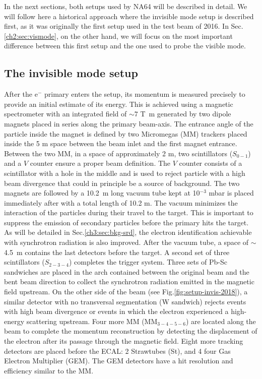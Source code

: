 In the next sections, both setups used by NA64 will be described in detail. We will follow here a historical approach where the invisible mode setup is described first, as it was originally the first setup used in the test beam of 2016. In Sec.\ref{ch2:sec:vismode}, on the other hand, we will focus on the most important difference between this first setup and the one used to probe the visible mode.


\subsection{The invisible mode setup}
\label{ch2:sec:invismode}

After the e$^-$ primary enters the setup, its momentum is measured precisely to provide an initial estimate of its energy. This is achieved using a magnetic spectrometer with an integrated field of $\sim 7$ \si{\tesla\meter} generated by two dipole magnets \cite{mbpl} placed in series along the primary beam-axis. The entrance angle of the particle inside the magnet is defined by two Micromegas (MM) trackers placed inside the 5 m space between the beam inlet and the first magnet entrance. Between the two MM, in a space of approximately 2 m, two scintillators ($S_{0-1}$) and a $V$ counter ensure a proper beam definition. The $V$ counter consists of a scintillator with a hole in the middle and is used to reject particle with a high beam divergence that could in principle be a source of background. The two magnets are followed by a \SI{10.2}{\meter} long vacuum tube kept at 10$^{-3}$ \si{mbar} is placed immediately after with a total length of 10.2 \si{m}. The vacuum minimizes the interaction of the particles during their travel to the target. This is important to suppress the emission of secondary particles before the primary hits the target. As will be detailed in Sec.\ref{ch3:sec:bkg-srd}, the electron identification achievable with synchrotron radiation is also improved. After the vacuum tube, a space of $\sim$ \SI{4.5}{\meter} contains the last detectors before the target. A second set of three scintillators ($S_{2-3-4}$) completes the trigger system. Three sets of Pb-Sc sandwiches are placed in the arch contained between the original beam and the bent beam direction to collect the synchrotron radiation emitted in the magnetic field upstream. On the other side of the beam (see Fig.\ref{fig:setup-invis-2018}), a similar detector with no transversal segmentation (W sandwich) rejects events with high beam divergence or events in which the electron experienced a high-energy scattering upstream. Four more MM (MM$_{3-4-5-6}$) are located along the beam to complete the momentum reconstruction by detecting the displacement of the electron after its passage through the magnetic field. Eight more tracking detectors are placed before the ECAL: 2 Strawtubes (St), and 4 four Gas Electron Multiplier (GEM). The GEM detectors have a hit resolution and efficiency similar to the MM.
